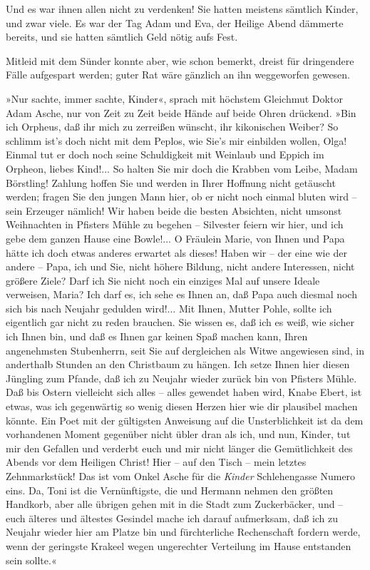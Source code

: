 Und es war ihnen allen nicht zu verdenken! Sie hatten meistens
sämtlich Kinder, und zwar viele. Es war der Tag Adam und Eva, der
Heilige Abend dämmerte bereits, und sie hatten sämtlich Geld nötig
aufs Fest.

Mitleid mit dem Sünder konnte aber, wie schon bemerkt, dreist für
dringendere Fälle aufgespart werden; guter Rat wäre gänzlich an ihn
weggeworfen gewesen.

»Nur sachte, immer sachte, Kinder«, sprach mit höchstem Gleichmut
Doktor Adam Asche, nur von Zeit zu Zeit beide Hände auf beide Ohren
drückend. »Bin ich Orpheus, daß ihr mich zu zerreißen wünscht, ihr
kikonischen Weiber? So schlimm ist's doch nicht mit dem Peplos, wie
Sie's mir einbilden wollen, Olga! Einmal tut er doch noch seine
Schuldigkeit mit Weinlaub und Eppich im Orpheon, liebes Kind!... So
halten Sie mir doch die Krabben vom Leibe, Madam Börstling! Zahlung
hoffen Sie und werden in Ihrer Hoffnung nicht getäuscht werden;
fragen Sie den jungen Mann hier, ob er nicht noch einmal bluten
wird – sein Erzeuger nämlich! Wir haben beide die besten Absichten,
nicht umsonst Weihnachten in Pfisters Mühle zu begehen – Silvester
feiern wir hier, und ich gebe dem ganzen Hause eine Bowle!... O
Fräulein Marie, von Ihnen und Papa hätte ich doch etwas anderes
erwartet als dieses! Haben wir – der eine wie der andere – Papa,
ich und Sie, nicht höhere Bildung, nicht andere Interessen, nicht
größere Ziele? Darf ich Sie nicht noch ein einziges Mal auf unsere
Ideale verweisen, Maria? Ich darf es, ich sehe es Ihnen an, daß
Papa auch diesmal noch sich bis nach Neujahr gedulden wird!... Mit
Ihnen, Mutter Pohle, sollte ich eigentlich gar nicht zu reden
brauchen. Sie wissen es, daß ich es weiß, wie sicher ich Ihnen bin,
und daß es Ihnen gar keinen Spaß machen kann, Ihren angenehmsten
Stubenherrn, seit Sie auf dergleichen als Witwe angewiesen sind, in
anderthalb Stunden an den Christbaum zu hängen. Ich setze Ihnen
hier diesen Jüngling zum Pfande, daß ich zu Neujahr wieder zurück
bin von Pfisters Mühle. Daß bis Ostern vielleicht sich alles –
alles gewendet haben wird, Knabe Ebert, ist etwas, was ich
gegenwärtig so wenig diesen Herzen hier wie dir plausibel machen
könnte. Ein Poet mit der gültigsten Anweisung auf die
Unsterblichkeit ist da dem vorhandenen Moment gegenüber nicht übler
dran als ich, und nun, Kinder, tut mir den Gefallen und verderbt
euch und mir nicht länger die Gemütlichkeit des Abends vor dem
Heiligen Christ! Hier – auf den Tisch – mein letztes Zehnmarkstück!
Das ist vom Onkel Asche für die \emph{Kinder} Schlehengasse Numero
eins. Da, Toni ist die Vernünftigste, die und Hermann nehmen den
größten Handkorb, aber alle übrigen gehen mit in die Stadt zum
Zuckerbäcker, und – euch älteres und ältestes Gesindel mache ich
darauf aufmerksam, daß ich zu Neujahr wieder hier am Platze bin und
fürchterliche Rechenschaft fordern werde, wenn der geringste
Krakeel wegen ungerechter Verteilung im Hause entstanden sein
sollte.«


